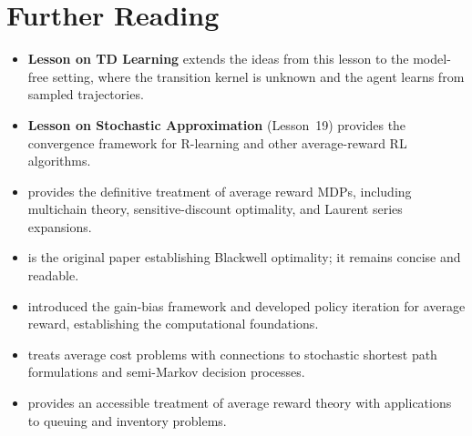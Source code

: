 \documentclass[11pt,a4paper]{article}
\begin{document}
\section{Further Reading}
\label{sec:further-reading}

\begin{itemize}
    \item \textbf{Lesson on TD Learning} extends the ideas from
    this lesson to the model-free setting, where the transition
    kernel is unknown and the agent learns from sampled trajectories.
    \item \textbf{Lesson on Stochastic Approximation} (Lesson~19)
    provides the convergence framework for R-learning and other
    average-reward RL algorithms.
    \item \citet[Chapters 8--10]{puterman2014} provides the
    definitive treatment of average reward MDPs, including multichain
    theory, sensitive-discount optimality, and Laurent series
    expansions.
    \item \citet{blackwell1962} is the original paper establishing
    Blackwell optimality; it remains concise and readable.
    \item \citet{howard1960} introduced the gain-bias framework and
    developed policy iteration for average reward, establishing the
    computational foundations.
    \item \citet[Chapter 7]{bertsekas2012} treats average cost
    problems with connections to stochastic shortest path formulations
    and semi-Markov decision processes.
    \item \citet{derman1970} provides an accessible treatment of
    average reward theory with applications to queuing and inventory
    problems.
\end{itemize}


\end{document}
